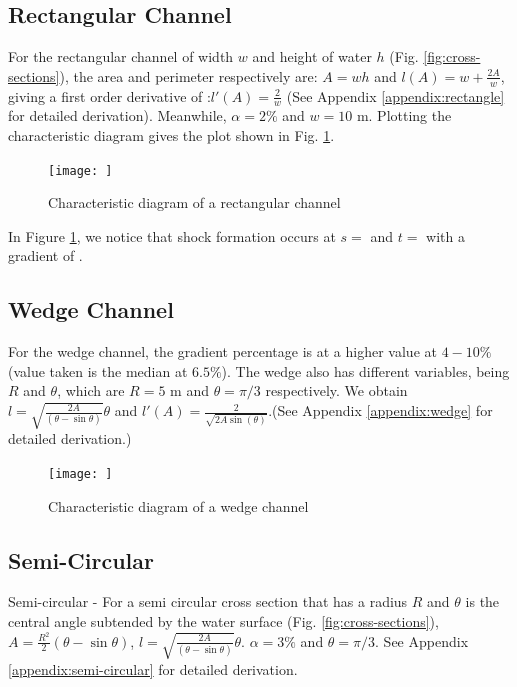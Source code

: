 \documentclass[12pt]{article}
\begin{document}
\subsection{Rectangular Channel}
For the rectangular channel of width $w$ and height of water $h$ (Fig. \ref{fig:cross-sections}), the area and perimeter respectively are: $A = wh$ and $l(A) = w + \frac{2A}{w}$, giving a first order derivative of :$l'(A) = \frac{2}{w}$ (See Appendix \ref{appendix:rectangle} for detailed derivation). Meanwhile, $\alpha = 2\%$ and $w = 10\text{ m}$. Plotting the characteristic diagram gives the plot shown in Fig. \ref{fig:char_rectangle}.
\begin{figure}
    \centering
    \texttt{[image: ]}
    \caption{Characteristic diagram of a rectangular channel}
    \label{fig:char_rectangle}
\end{figure}

In Figure \ref{fig:char_rectangle}, we notice that shock formation occurs at $s= $ and $t= $ with a gradient of .

\subsection{Wedge Channel}
For the wedge channel, the gradient percentage is at a higher value at $4-10\%$ (value taken is the median at $6.5\%$). The wedge also has different variables, being $R$ and $\theta$, which are $R = 5\text{ m}$ and $\theta = \pi/3$ respectively. We obtain $l =\sqrt{\frac{2A}{\left(\theta - \sin\theta\right)}}\theta$ and $l'(A) =\frac{2}{\sqrt{2A\sin(\theta)}}$.(See Appendix \ref{appendix:wedge} for detailed derivation.)

\begin{figure}
    \centering
    \texttt{[image: ]}
    \caption{Characteristic diagram of a wedge channel}
    \label{fig:enter-label}
\end{figure}

\subsection{Semi-Circular}
Semi-circular - For a semi circular cross section that has a radius $R$ and $\theta$ is the central angle subtended by the water surface (Fig. \ref{fig:cross-sections}), $A = \frac{R^2}{2}\left(\theta - \sin\theta\right)$, $l = \sqrt{\frac{2A}{\left(\theta - \sin\theta\right)}}\theta$. $\alpha = 3\%$ and $\theta = \pi/3$. See Appendix \ref{appendix:semi-circular} for detailed derivation.
\end{document}

